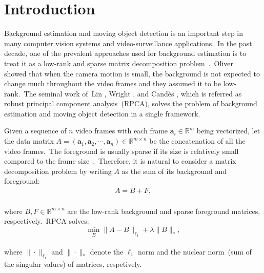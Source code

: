 \documentclass[10pt,twocolumn,letterpaper]{article}
\begin{document}
\section{Introduction}
\vspace{-0.0in}
Background estimation and moving object detection is an important step in many computer vision systems and video-surveillance applications.~In the past decade, one of the prevalent approaches used for background estimation is to treat it as a low-rank and sparse matrix decomposition problem~\cite{Bouwmans201431,Bouwmans2016,Sobral20144}.~Oliver \etal~\cite{oliver1999} showed that when the camera motion is small, the background is not expected to change much throughout the video frames and they assumed it to be low-rank.~The seminal work of~Lin \etal, Wright \etal, and Cand\`{e}s \etal\cite{candeslimawright,LinChenMa,APG}, which is referred as robust principal component analysis~(RPCA), solves the problem of background estimation and moving object detection in a single framework.

Given a sequence of $n$ video frames with each frame ${\mathbf a}_i\in {\mathbb R}^m$ being vectorized, let the data matrix $A=({\mathbf a}_1, {\mathbf a}_2,\cdots,{\mathbf a}_n)\in {\mathbb R}^{m\times n}$ be the concatenation of all the video frames.~The foreground is usually sparse if its size is relatively small compared to the frame size~\cite{candeslimawright,LinChenMa,APG}.~Therefore, it is natural to consider a matrix decomposition problem by writing $A$ as the sum of its background and foreground:
\vspace{-0.05in}
\begin{align*}
    A=B+F,
\end{align*}
~\\[-0.2in]
where $B,F\in {\mathbb R}^{m\times n}$ are the low-rank background and sparse foreground matrices, respectively.~RPCA solves:
\vspace{-0.05in}
\begin{equation}\label{rpca}
\min_B \|A-B\|_{\ell_1}+\lambda \|B\|_*,
\end{equation}
~\\[-0.1in]
where $\|\cdot\|_{\ell_1}$ and $\|\cdot\|_*$ denote the $\ell_1$ norm and the nuclear norm~(sum of the singular values) of matrices, respetively.  
\end{document}
